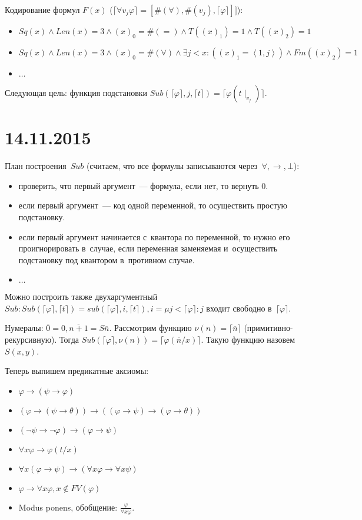 \documentclass{article}
\theoremstyle{remark}
\renewcommand{\phi}{\varphi}
\begin{document}
Кодирование формул $F(x)$ ($\lceil \forall v_j \phi \rceil = [\#(\forall),
\#(v_j), \lceil \phi \rceil]]$):
\begin{itemize}
  \item $Sq(x) \land Len(x) = 3 \land (x)_0 = \#(=) \land T((x)_1) = 1 \land
    T((x)_2) = 1$
  \item $Sq(x) \land Len(x) = 3 \land (x)_0 = \#(\forall) \land \exists j < x:
    ((x)_1 = \left<1, j\right>) \land Fm((x)_2) = 1$
  \item $\ldots$
\end{itemize}

Следующая цель: функция подстановки $Sub(\lceil \phi \rceil, j, \lceil t \rceil)
= \lceil \phi(t \mid_{v_j}) \rceil$.

\section*{14.11.2015}

План построения~$Sub$ (считаем, что все формулы записываются через~$\forall,
\rightarrow, \bot$):
\begin{itemize}
  \item проверить, что первый аргумент~--- формула, если нет, то вернуть 0.
  \item если первый аргумент~--- код одной переменной, то осуществить простую
    подстановку.
  \item если первый аргумент начинается с~квантора по переменной, то
    нужно его проигнорировать в~случае, если переменная заменяемая и~осуществить
    подстановку под квантором в~противном случае.
  \item $\ldots$
\end{itemize}

Можно построить также двухаргументный~$Sub: Sub(\lceil \phi \rceil, \lceil t
\rceil) = sub(\lceil \phi \rceil, i, \lceil t \rceil), i = \mu j < \lceil \phi
\rceil: j$ входит свободно в~$\lceil \phi \rceil$.

Нумералы: $\overline 0 = 0, \overline{n + 1} = S\overline n$. Рассмотрим функцию
$\nu(n) = \lceil \overline n \rceil$ (примитивно-рекурсивную). Тогда $Sub(\lceil
\phi \rceil, \nu(n)) = \lceil \phi(\overline{n} / x) \rceil$. Такую функцию
назовем~$S(x, y)$.

Теперь выпишем предикатные аксиомы:
\begin{itemize}
  \item $\phi \rightarrow (\psi \rightarrow \phi)$
  \item $(\phi \rightarrow (\psi \rightarrow \theta)) \rightarrow ((\phi
    \rightarrow \psi) \rightarrow (\phi \rightarrow \theta))$
  \item $(\neg \psi \rightarrow \neg \phi) \rightarrow (\phi \rightarrow \psi)$
  \item $\forall x \phi \rightarrow \phi(t / x)$
  \item $\forall x (\phi \rightarrow \psi) \rightarrow (\forall x \phi
    \rightarrow \forall x \psi)$
  \item $\phi \rightarrow \forall x \phi, x \not\in FV(\phi)$
  \item Modus ponens, обобщение: $\frac{\phi}{\forall x \phi}$.
\end{itemize}
\end{document}
